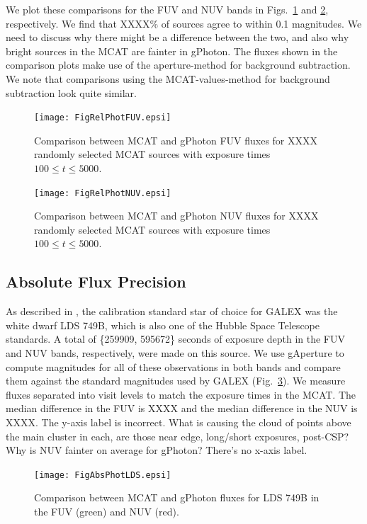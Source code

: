 \documentclass[5p]{elsarticle}
\begin{document}
We plot these comparisons for the FUV and NUV bands in Figs.\ \ref{fuvrelphot} and \ref{nuvrelphot}, respectively.  We find that {\color{red}XXXX\%} of sources agree to within 0.1 magnitudes.  {\color{red}We need to discuss why there might be a difference between the two, and also why bright sources in the MCAT are fainter in gPhoton.}  The fluxes shown in the comparison plots make use of the aperture-method for background subtraction.  We note that comparisons using the MCAT-values-method for background subtraction look quite similar.

\begin{figure}
\texttt{[image: FigRelPhotFUV.epsi]}
\caption{Comparison between MCAT and gPhoton FUV fluxes for {\color{red}XXXX} randomly selected MCAT sources with exposure times $100 \leq t \leq 5000$. \label{fuvrelphot}}
\end{figure}

\begin{figure}
\texttt{[image: FigRelPhotNUV.epsi]}
\caption{Comparison between MCAT and gPhoton NUV fluxes for {\color{red}XXXX} randomly selected MCAT sources with exposure times $100 \leq t \leq 5000$. \label{nuvrelphot}}
\end{figure}


\subsection{Absolute Flux Precision}
As described in \citet{mor2007}, the calibration standard star of choice for GALEX was the white dwarf LDS 749B, which is also one of the Hubble Space Telescope standards. A total of \{259909, 595672\} seconds of exposure depth in the FUV and NUV bands, respectively, were made on this source. We use gAperture to compute magnitudes for all of these observations in both bands and compare them against the standard magnitudes used by GALEX (Fig.\ \ref{ldsabsphot}).  We measure fluxes separated into visit levels to match the exposure times in the MCAT.  The median difference in the FUV is {\color{red}XXXX} and the median difference in the NUV is {\color{red}XXXX}.  {\color{red}The y-axis label is incorrect.  What is causing the cloud of points above the main cluster in each, are those near edge, long/short exposures, post-CSP?  Why is NUV fainter on average for gPhoton?  There's no x-axis label.}

\begin{figure}
\texttt{[image: FigAbsPhotLDS.epsi]}
\caption{Comparison between MCAT and gPhoton fluxes for LDS 749B in the FUV (green) and NUV (red). \label{ldsabsphot}}
\end{figure}
\end{document}
